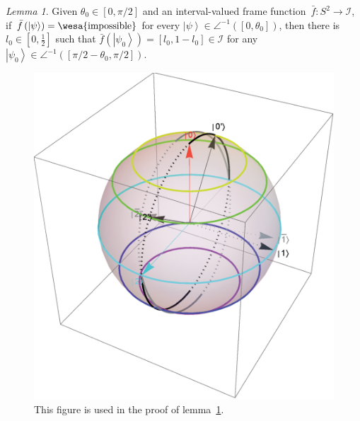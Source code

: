 \documentclass[12pt]{iopart}
\theoremstyle{remark}
\newtheorem{lemma}{Lemma}
\newcommand{\imposs}{{\mbox{\wesa{impossible}}}}
\newcommand{\ket}[1]{{\left\vert{#1}\right\rangle}}
\begin{document}
\begin{lemma}\label{lemma:imposs-imply-same-value}Given $\theta_{0}\in\left[0,\pi / 2\right]$
and an interval-valued frame function~$\bar{f}:S^{2}\rightarrow\mathscr{I}$,
if $\bar{f}\left(\ket{\psi}\right)=\imposs$ for every $\ket{\psi}\in\angle^{-1}\left(\left[0,\theta_{0}\right]\right)$,
then there is $l_{0}\in\left[0,\frac{1}{2}\right]$ such that $\bar{f}\left(\ket{\psi_{0}}\right)=\left[l_{0},1-l_{0}\right]\in\mathscr{I}$
for any $\ket{\psi_{0}}\in\angle^{-1}\left(\left[\pi / 2-\theta_{0},\pi / 2\right]\right)$.\end{lemma}
\begin{figure}
\begin{centering}
\includegraphics[scale=0.38]{figureb1.eps} 
\par\end{centering}
\caption{\label{fig:three-dimensional-real-frame-1}This figure is used in
the proof of lemma~\ref{lemma:imposs-imply-same-value}.}
\end{figure}
\end{document}
